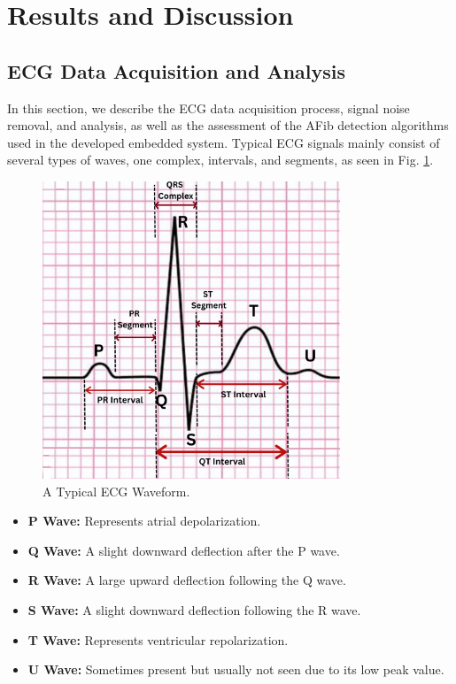 \documentclass[conference]{IEEEtran}
\begin{document}
\section{Results and Discussion}


\subsection{ECG Data Acquisition and Analysis} 

In this section, we describe the ECG data acquisition process, signal noise removal, and analysis, as well as the assessment of the AFib detection algorithms used in the developed embedded system. Typical ECG signals mainly consist of several types of waves, one complex, intervals, and segments, as seen in Fig. \ref{fig-12:Typical-ECG-Waveform}.

\begin{figure}[htbp]
\centerline{\includegraphics[width=3.5in]{12-Typical ECG webform.png}}
\caption{A Typical ECG Waveform.}
\label{fig-12:Typical-ECG-Waveform}
\end{figure}

\begin{itemize}
    \item \textbf{P Wave:} Represents atrial depolarization.
    \item \textbf{Q Wave:} A slight downward deflection after the P wave.
    \item \textbf{R Wave:} A large upward deflection following the Q wave.
    \item \textbf{S Wave:} A slight downward deflection following the R wave.
    \item \textbf{T Wave:} Represents ventricular repolarization.
    \item \textbf{U Wave:} Sometimes present but usually not seen due to its low peak value.
\end{itemize}
\end{document}
